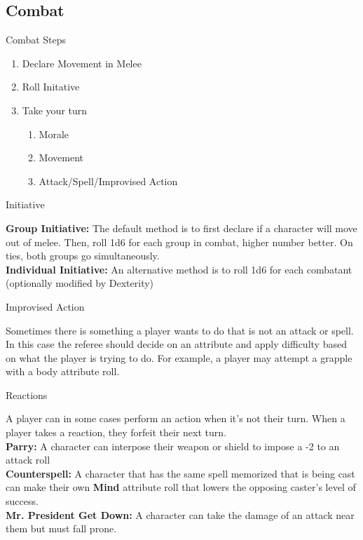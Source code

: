 \documentclass[18pt]{article}
\begin{document}
\begin{multicols}{2}
\section*{Combat} %
\begin{mercHeading}
Combat Steps
\end{mercHeading}
\begin{enumerate}
\setlength\itemsep{0em}
	\item Declare Movement in Melee
	\item Roll Initative
	\item Take your turn
	\begin{enumerate}
	\item Morale
	\item Movement
	\item Attack/Spell/Improvised Action
	\end{enumerate}
\end{enumerate}
\begin{mercHeading}
Initiative 
\end{mercHeading}
\textbf{Group Initiative:} The default method is to first declare if a character will move out of melee. Then, roll 1d6 for each group in combat, higher number better. On ties, both groups go simultaneously.\\
\textbf{Individual Initiative:} An alternative method is to roll 1d6 for each combatant (optionally modified by Dexterity)

\begin{mercHeading}
Improvised Action 
\end{mercHeading}
Sometimes there is something a player wants to do that is not an attack or spell. In this case the referee should decide on an attribute and apply difficulty based on what the player is trying to do. For example, a player may attempt a grapple with a body attribute roll.

\begin{mercHeading}
Reactions
\end{mercHeading}
A player can in some cases perform an action when it's not their turn. When a player takes a reaction, they forfeit their next turn.\\
\textbf{Parry:} A character can interpose their weapon or shield to impose a -2 to an attack roll\\
\textbf{Counterspell:} A character that has the same spell memorized that is being cast can make their own \textbf{Mind} attribute roll that lowers the opposing caster's level of success.\\
\textbf{Mr. President Get Down:} A character can take the damage of an attack near them but must fall prone.


\end{multicols}
\end{document}
